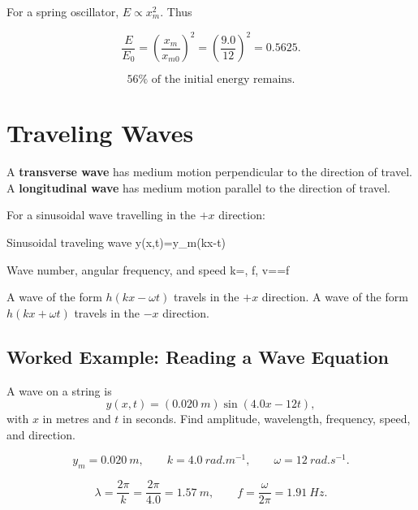 \documentclass{studentnotes}
\begin{document}
For a spring oscillator, \(E\propto x_m^2\). Thus

\[
    \frac{E}{E_0}
    =
    \left(\frac{x_m}{x_{m0}}\right)^2
    =
    \left(\frac{9.0}{12}\right)^2
    =
    0.5625.
\]

\[
    \boxed{56\% \text{ of the initial energy remains.}}
\]

\section{Traveling Waves}

\begin{definition}
    A \textbf{transverse wave} has medium motion perpendicular to the direction
    of travel. A \textbf{longitudinal wave} has medium motion parallel to the
    direction of travel.
\end{definition}

For a sinusoidal wave travelling in the \(+x\) direction:

\begin{namedformula}{Sinusoidal traveling wave}
    y(x,t)=y_m\sin(kx-\omega t)
\end{namedformula}

\begin{namedformula}{Wave number, angular frequency, and speed}
    k=\frac{2\pi}{\lambda},
    \qquad
    \pi f,
    \qquad
    v==\lambda f
\end{namedformula}

\begin{importantnote}
    A wave of the form \(h(kx-\omega t)\) travels in the \(+x\) direction. A
    wave of the form \(h(kx+\omega t)\) travels in the \(-x\) direction.
\end{importantnote}

\subsection{Worked Example: Reading a Wave Equation}

A wave on a string is
\[
    y(x,t)=(\SI{0.020}{m})\sin(4.0x-12t),
\]
with \(x\) in metres and \(t\) in seconds. Find amplitude, wavelength, frequency,
speed, and direction.

\[
    y_m=\SI{0.020}{m},
    \qquad
    k=\SI{4.0}{rad.m^{-1}},
    \qquad
    \omega=\SI{12}{rad.s^{-1}}.
\]

\[
    \lambda=\frac{2\pi}{k}=\frac{2\pi}{4.0}=\SI{1.57}{m},
    \qquad
    f=\frac{\omega}{2\pi}=\SI{1.91}{Hz}.
\]
\end{document}
